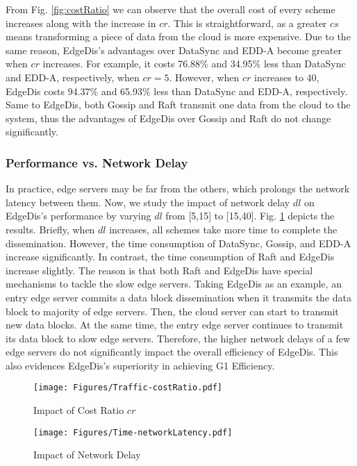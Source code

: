 \documentclass[10pt,journal,compsoc]{IEEEtran}
\begin{document}
From Fig. \ref{fig:costRatio} we can observe that the overall cost of every scheme increases along with the increase in $cr$. This is straightforward, as a greater $cs$ means transforming a piece of data from the cloud is more expensive. Due to the same reason, EdgeDis's advantages over DataSync and EDD-A become greater when $cr$ increases. For example, it costs 76.88\% and 34.95\% less than DataSync and EDD-A, respectively, when $cr=5$. However, when $cr$ increases to 40, EdgeDis costs 94.37\% and 65.93\% less than DataSync and EDD-A, respectively. Same to EdgeDis, both Gossip and Raft transmit one data from the cloud to the system, thus the advantages of EdgeDis over Gossip and Raft do not change significantly. 


\subsubsection{Performance vs. Network Delay}

In practice, edge servers may be far from the others, which prolongs the network latency between them. Now, we study the impact of network delay $dl$ on EdgeDis's performance by varying $dl$ from [5,15] to [15,40]. Fig. \ref{fig:networkdelay} depicts the results. Briefly, when $dl$ increases, all schemes take more time to complete the dissemination. However, the time consumption of DataSync, Gossip, and EDD-A increase significantly. In contrast, the time consumption of Raft and EdgeDis increase slightly. The reason is that both Raft and EdgeDis have special mechanisms to tackle the slow edge servers. Taking EdgeDis as an example, an entry edge server commits a data block dissemination when it transmits the data block to majority of edge servers. Then, the cloud server can start to transmit new data blocks. At the same time, the entry edge server continues to transmit its data block to slow edge servers. Therefore, the higher network delays of a few edge servers do not significantly impact the overall efficiency of EdgeDis. This also evidences EdgeDis's superiority in achieving G1 Efficiency. 

\begin{figure}[tbp]
\begin{minipage}[c]{0.49\linewidth}
    \centering
    \texttt{[image: Figures/Traffic-costRatio.pdf]}
    \vspace{-1em}
    \caption{Impact of Cost Ratio $cr$}
    \vspace{-0.5em}
    \label{fig:costRatio}
\end{minipage}
\begin{minipage}[c]{0.49\linewidth}
    \centering 
    \texttt{[image: Figures/Time-networkLatency.pdf]}
    \vspace{-1em}
    \caption{Impact of Network Delay}
    \label{fig:networkdelay}
    \vspace{-0.5em}
\end{minipage}
\end{figure}
\end{document}
